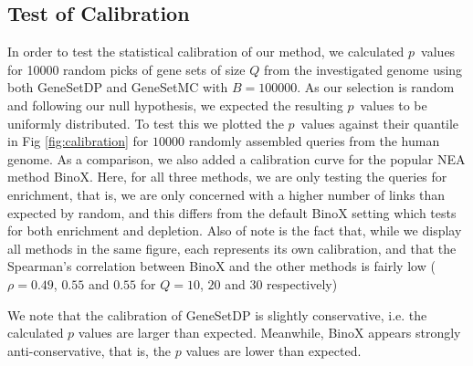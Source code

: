 \documentclass[10pt,letterpaper]{article}
\begin{document}
\subsection*{Test of Calibration}

In order to test the statistical calibration of our method, we calculated $p$~values for 10000 random picks of gene sets of size $Q$ from the investigated genome using both GeneSetDP and GeneSetMC with $B = 100000$. As our selection is random and following our null hypothesis, we expected the resulting $p$~values to be uniformly distributed. To test this we plotted the $p$~values against their quantile in Fig \ref{fig:calibration} for $10000$ randomly assembled queries from the human genome. As a comparison, we also added a calibration curve for the popular NEA method BinoX\cite{ogris2016novel}. Here, for all three methods, we are only testing the queries for enrichment, that is, we are only concerned with a higher number of links than expected by random, and this differs from the default BinoX setting which tests for both enrichment and depletion.
Also of note is the fact that, while we display all methods in the same figure, each represents its own calibration, and that the Spearman's correlation between BinoX and the other methods is fairly low ($\rho = 0.49$, $0.55$ and $0.55$ for $Q=10$, $20$ and $30$ respectively)

We note that the calibration of GeneSetDP is slightly conservative, i.e. the calculated $p$ values are larger than expected. Meanwhile, BinoX appears strongly anti-conservative, that is, the $p$ values are lower than expected.
\end{document}
